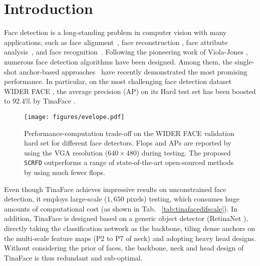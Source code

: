 \documentclass[10pt,twocolumn,letterpaper]{article}
\newcommand{\dsname}[1]{\texttt{\small #1}\xspace}
\newcommand{\scrfd}{\dsname{SCRFD}}
\begin{document}
\section{Introduction}
Face detection is a long-standing problem in computer vision with many applications, such as face alignment~\cite{bulat2017far}, face reconstruction \cite{feng2018joint}, face attribute analysis~\cite{zhang2018jointexpression,pan2018mean}, and face recognition~\cite{schroff2015facenet,deng2018arcface}.
Following the pioneering work of Viola-Jones \cite{viola2004robust}, numerous face detection algorithms have been designed. 
Among them, the single-shot anchor-based approaches~\cite{najibi2017ssh,zhang2017s3fd,tang2018pyramidbox,li2019dsfd,ming2019group,deng2019retinaface,liu2019hambox,zhu2020tinaface} have recently demonstrated the most promising performance. In particular, on the most challenging face detection dataset WIDER FACE \cite{yang2016wider}, the average precision (AP) on its Hard test set has been boosted to $92.4\%$ by TinaFace \cite{zhu2020tinaface}. 

\begin{figure}[t!]
\centering
\texttt{[image: figures/evelope.pdf]}
\caption{Performance-computation trade-off on the WIDER FACE validation hard set for different face detectors. Flops and APs are reported by using the VGA resolution ($640\times480$) during testing. The proposed \scrfd outperforms a range of state-of-the-art open-sourced methods by using much fewer flops.}
\vspace{-4mm}
\label{fig:evelope}
\end{figure}

Even though TinaFace \cite{zhu2020tinaface} achieves impressive results on unconstrained face detection, it employs large-scale (\eg $1,650$ pixels) testing, which consumes huge amounts of computational cost (as shown in Tab.~ \ref{tab:tinafacedifscale}). In addition, TinaFace is designed based on a generic object detector (\ie RetinaNet \cite{lin2017focal}), directly taking the classification network as the backbone, tiling dense anchors on the multi-scale feature maps (\ie P2 to P7 of neck) and adopting heavy head designs. Without considering the prior of faces, the backbone, neck and head design of TinaFace is thus redundant and sub-optimal. 
\end{document}
